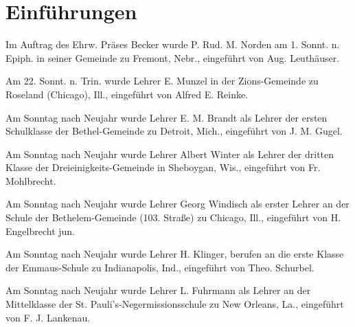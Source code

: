 \chapter{Einführungen}

Im Auftrag des Ehrw. Präses Becker wurde P. Rud. M. Norden am 1. Sonnt. n. Epiph. in seiner Gemeinde zu Fremont, Nebr., eingeführt von Aug. Leuthäuser.

Am 22. Sonnt. n. Trin. wurde Lehrer E. Munzel in der Zions-Gemeinde zu Roseland (Chicago), Ill., eingeführt von Alfred E. Reinke.

Am Sonntag nach Neujahr wurde Lehrer E. M. Brandt als Lehrer der ersten Schulklasse der Bethel-Gemeinde zu Detroit, Mich., eingeführt von J. M. Gugel.


Am Sonntag nach Neujahr wurde Lehrer Albert Winter als Lehrer der dritten Klasse der Dreieinigkeits-Gemeinde in Sheboygan, Wis., eingeführt von Fr. Mohlbrecht.

Am Sonntag nach Neujahr wurde Lehrer Georg Windisch als erster Lehrer an der Schule der Bethelem-Gemeinde (103. Straße) zu Chicago, Ill., eingeführt von H. Engelbrecht jun.

Am Sonntag nach Neujahr wurde Lehrer H. Klinger, berufen an die erste Klasse der Emmaus-Schule zu Indianapolis, Ind., eingeführt von Theo. Schurbel.

Am Sonntag nach Neujahr wurde Lehrer L. Fuhrmann als Lehrer an der Mittelklasse der St. Pauli’s-Negermissionsschule zu New Orleans, La., eingeführt von F. J. Lankenau.
